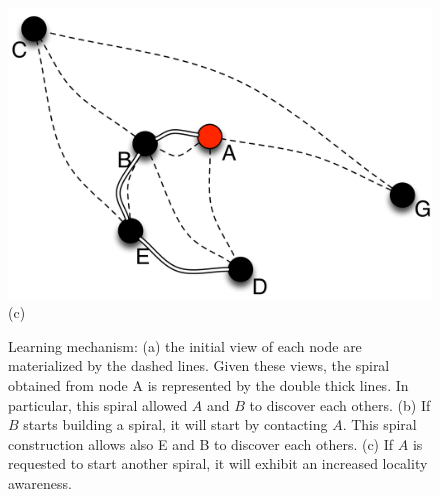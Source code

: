 \begin{figure}[ht]
{\begin{center}
{\begin{minipage}{.3\linewidth}
	  \begin{center}
	    \includegraphics[width=1.05\linewidth]{Figures/learning3.png}\\(c)
	  \end{center}
	\end{minipage}
	\caption{Learning mechanism: (a) the initial view of each node are materialized by
          the dashed lines. Given these views, the spiral obtained from node A is
          represented by the double thick lines. In particular, this spiral allowed $A$
          and $B$ to discover each others. (b) If $B$ starts building a spiral, it will
          start by contacting $A$. This spiral construction allows also E and B to
          discover each others. (c) If $A$ is requested to start another spiral, it will
          exhibit an increased locality awareness.\label{fig:learning}} }
      \end{center}
}
\end{figure}

